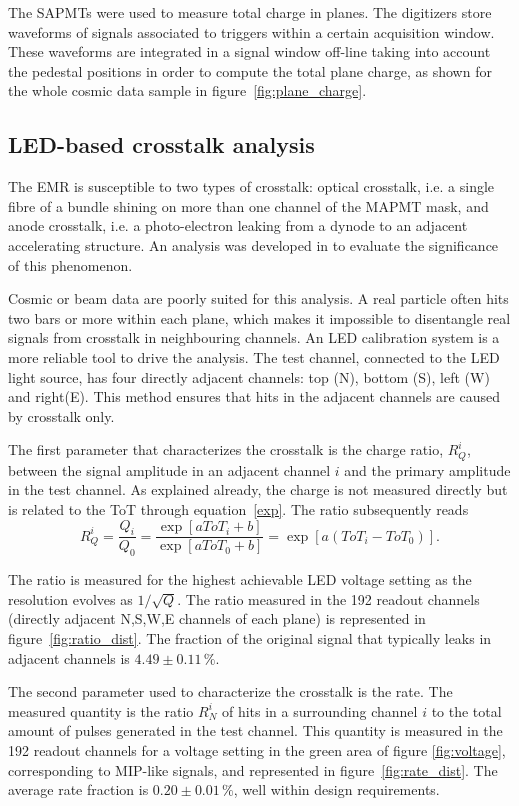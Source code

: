 \documentclass[a4paper,11pt]{article}
\begin{document}
The SAPMTs were used to measure total charge in planes. The digitizers store waveforms of signals associated to triggers within a certain acquisition
window. These waveforms are integrated in a signal window off-line taking into account the pedestal positions in order to compute the total plane
charge, as shown for the whole cosmic data sample in figure~\ref{fig:plane_charge}.

\subsection{LED-based crosstalk analysis}\label{sec_xt}
The EMR is susceptible to two types of crosstalk: optical crosstalk, i.e. a single fibre of a bundle shining on more than one channel of the MAPMT mask,
and anode crosstalk, i.e. a photo-electron leaking from a dynode to an adjacent accelerating structure. An analysis was developed in \cite{emr_xt, Francois}
to evaluate the significance of this phenomenon.

Cosmic or beam data are poorly suited for this analysis. A real particle often hits two bars or more within each plane, which makes it impossible to
disentangle real signals from crosstalk in neighbouring channels. An LED calibration system is a more reliable tool to drive the analysis. The test channel,
connected to the LED light source, has four directly adjacent channels: top (N), bottom (S), left (W) and right(E). This method ensures that hits in the
adjacent channels are caused by crosstalk only.

The first parameter that characterizes the crosstalk is the charge ratio, $R_Q^i$, between the signal amplitude in an adjacent channel $i$ and the primary
amplitude in the test channel. As explained already, the charge is not measured directly but is related to the ToT through equation~\ref{exp}. The ratio
subsequently reads
\begin{equation}
R_Q^i=\frac{Q_i}{Q_0}=\frac{\exp[aToT_i+b]}{\exp[aToT_0+b]}=\exp\left[a(ToT_i-ToT_0)\right].
\end{equation}

The ratio is measured for the highest achievable LED voltage setting as the resolution evolves as $1/\sqrt{Q}$. The ratio measured in the 192 readout channels
(directly adjacent N,S,W,E channels of each plane) is represented in figure~\ref{fig:ratio_dist}. The fraction of the original signal that typically leaks in
adjacent channels is $4.49\pm0.11\,\%$.

The second parameter used to characterize the crosstalk is the rate. The measured quantity is the ratio $R_N^i$ of hits in a surrounding channel $i$ to the
total amount of pulses generated in the test channel. This quantity is measured in the 192 readout channels for a voltage setting in the green area of figure
\ref{fig:voltage}, corresponding to MIP-like signals, and represented in figure~\ref{fig:rate_dist}. The average rate fraction is $0.20\pm0.01\,\%$, well
within design requirements.
\end{document}

